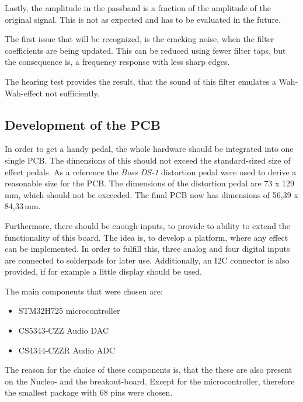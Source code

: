 Lastly, the amplitude in the passband is a fraction of the amplitude of the original signal.
This is not as expected and has to be evaluated in the future. %

The first issue that will be recognized, is the cracking noise, when the filter coefficients are being
updated. This can be reduced using fewer filter taps, but the consequence is, a frequency response with
less sharp edges.

The hearing test provides the result, that the sound of this filter emulates a Wah-Wah-effect not sufficiently.




\subsection{Development of the PCB}

In order to get a handy pedal, the whole hardware should be integrated into one single \ac{PCB}.
The dimensions of this should not exceed the standard-sized size of effect pedals. As a reference the
\textit{Boss DS-1} distortion pedal were used to derive a reasonable size for the \ac{PCB}. The dimensions of the
distortion pedal are 73 x 129\,mm, which should not be exceeded. The final \ac{PCB} now has dimensions of
56,39 x 84,33\,mm.

Furthermore, there should be enough inputs, to provide to ability to extend the functionality of this board.
The idea is, to develop a platform, where any effect can be implemented. In order to fulfill this, three analog and
four digital inputs are connected to solderpads for later use. Additionally, an \ac{I2C} connector is also
provided, if for example a little display should be used.

The main components that were chosen are:

\begin{itemize}
    \item STM32H725 microcontroller
    \item CS5343-CZZ Audio \ac{DAC}
    \item CS4344-CZZR Audio \ac{ADC}
\end{itemize}

The reason for the choice of these components is, that the these are also present on the Nucleo- and the
breakout-board. Except for the microcontroller, therefore the smallest package with 68 pins were chosen.

